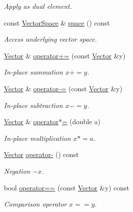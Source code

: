 \begin{DoxyCompactItemize}
\begin{DoxyCompactList}\small\item\em \-Apply as dual element. \end{DoxyCompactList}\item 
\hypertarget{classSpacy_1_1VectorBase_aa999dbf9d679d895dfe04c10fbf9f5e9}{const \hyperlink{classSpacy_1_1VectorSpace}{\-Vector\-Space} \& \hyperlink{classSpacy_1_1VectorBase_aa999dbf9d679d895dfe04c10fbf9f5e9}{space} () const }\label{classSpacy_1_1VectorBase_aa999dbf9d679d895dfe04c10fbf9f5e9}

\begin{DoxyCompactList}\small\item\em \-Access underlying vector space. \end{DoxyCompactList}\item 
\hyperlink{classSpacy_1_1FEniCS_1_1Vector}{\-Vector} \& \hyperlink{classSpacy_1_1AddArithmeticOperators_afad1d01e1e8c6f75290ac46d9b047ea8}{operator+=} (const \hyperlink{classSpacy_1_1FEniCS_1_1Vector}{\-Vector} \&y)
\begin{DoxyCompactList}\small\item\em \-In-\/place summation $ x+=y$. \end{DoxyCompactList}\item 
\hyperlink{classSpacy_1_1FEniCS_1_1Vector}{\-Vector} \& \hyperlink{classSpacy_1_1AddArithmeticOperators_a9fa91e177d13203cfe8cfa991c64ca36}{operator-\/=} (const \hyperlink{classSpacy_1_1FEniCS_1_1Vector}{\-Vector} \&y)
\begin{DoxyCompactList}\small\item\em \-In-\/place subtraction $ x-=y$. \end{DoxyCompactList}\item 
\hyperlink{classSpacy_1_1FEniCS_1_1Vector}{\-Vector} \& \hyperlink{classSpacy_1_1AddArithmeticOperators_a1d3db95b24fd2bc1de712c9e04c47e2f}{operator$\ast$=} (double a)
\begin{DoxyCompactList}\small\item\em \-In-\/place multiplication $ x*=a$. \end{DoxyCompactList}\item 
\hyperlink{classSpacy_1_1FEniCS_1_1Vector}{\-Vector} \hyperlink{classSpacy_1_1AddArithmeticOperators_a5acd030bf265d130983fd6e3c5b68be5}{operator-\/} () const
\begin{DoxyCompactList}\small\item\em \-Negation $ -x$. \end{DoxyCompactList}\item 
bool \hyperlink{classSpacy_1_1AddArithmeticOperators_a5ff1909f49f4a705d69663dc2d4b6316}{operator==} (const \hyperlink{classSpacy_1_1FEniCS_1_1Vector}{\-Vector} \&y) const
\begin{DoxyCompactList}\small\item\em \-Comparison operator $ x==y$. \end{DoxyCompactList}\end{DoxyCompactItemize}
